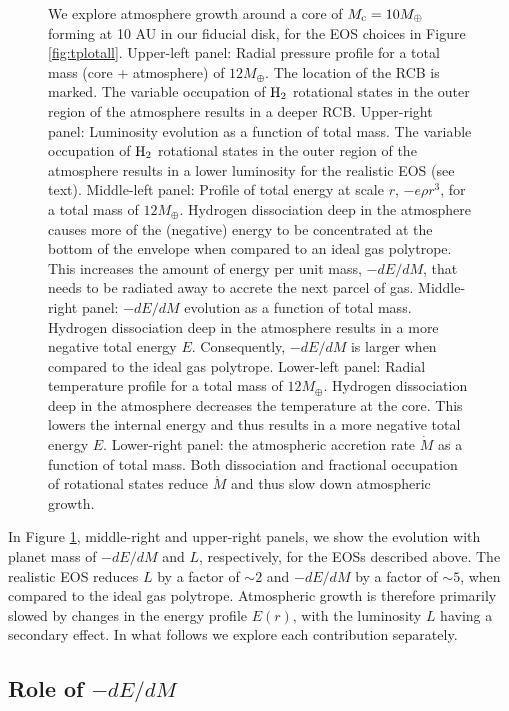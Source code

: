 \documentclass[apj]{emulateapj}
\newcommand{\co}{_{\rm c}}
\begin{document}
\begin{figure}[tb]
{We explore atmosphere growth around a core of $M\co=10 M_{\oplus}$ forming at 10 AU in our fiducial disk, for the EOS choices in Figure \ref{fig:tplotall}.  Upper-left panel: Radial pressure profile for a total mass (core + atmosphere) of $12 M_{\oplus}$. The location of the RCB is marked. The variable occupation of $\rm H_2$ rotational states in the outer region of the atmosphere results in a deeper RCB. Upper-right panel:  Luminosity evolution as a function of total mass. The variable occupation of $\rm H_2$ rotational states in the outer region of the atmosphere results in a lower luminosity for the realistic EOS (see text). Middle-left panel: Profile of total energy at scale $r$, $-e \rho r^3$, for a total mass of $12 M_{\oplus}$. Hydrogen dissociation deep in the atmosphere causes more of the (negative) energy to be concentrated at the bottom of the envelope when compared to an ideal gas polytrope. This increases the amount of energy per unit mass, $-dE/dM$,  that needs to be radiated away to accrete the next parcel of gas.  Middle-right panel:  $-dE/dM$ evolution as a function of total mass. Hydrogen dissociation deep in the atmosphere results in a more negative total energy $E$. Consequently, $-dE/dM$ is larger when compared to the ideal gas polytrope. Lower-left panel:  Radial temperature profile for a total mass of $12 M_{\oplus}$.  Hydrogen dissociation deep in the atmosphere decreases the temperature at the core. This lowers the internal energy and thus results in a more negative total energy $E$.   Lower-right panel: the atmospheric accretion rate $\dot{M}$ as a function of total mass. Both dissociation and fractional occupation of rotational states reduce $\dot{M}$ and thus slow down atmospheric growth.}
\label{fig:all_plot}
\end{figure}

In Figure \ref{fig:all_plot}, middle-right and upper-right panels, we show the evolution with planet mass of $-dE/dM$ and $L$, respectively, for the EOSs described above. The realistic EOS reduces $L$ by a factor of $\sim$$2$ and $-dE/dM$ by a factor of $\sim$$5$, when compared to the ideal gas polytrope. Atmospheric growth is therefore primarily slowed by changes in the energy profile $E(r)$, with the luminosity $L$ having a secondary effect. In what follows we explore each contribution separately. 


\subsection{Role of $-dE/dM$}
\end{document}
